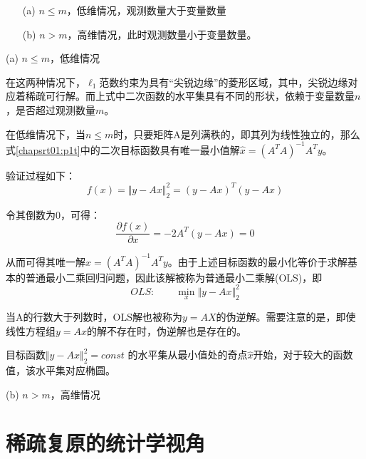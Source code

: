 \begin{enumerate}
	\item  [(a)]  $ n\leq m $，低维情况，观测数量大于变量数量
	\item  [(b)]  $ n>m $，高维情况，此时观测数量小于变量数量。
\end{enumerate}

(a)  $ n\leq m $，低维情况


在这两种情况下，$ \ell_1 $范数约束为具有“尖锐边缘”的菱形区域，其中，尖锐边缘对应着稀疏可行解。而上式中二次函数的水平集具有不同的形状，依赖于变量数量$ n $，是否超过观测数量$ m $。

在低维情况下，当$ n\leq m $时，只要矩阵A是列满秩的，即其列为线性独立的，那么式\ref{chapsrt01:p1t}中的二次目标函数具有唯一最小值解$ \hat{x} =(A^TA)^{-1}A^T y $。

验证过程如下：
\begin{equation*}\label{key}
f(x)       =         \Vert y-Ax \Vert_2^2 = (y-Ax)^{T}(y-Ax)    
\end{equation*}

令其倒数为0，可得：
\begin{equation*}\label{key}
\dfrac{\partial f(x)}{\partial x}  = -2A^T(y-Ax) =0
\end{equation*}

从而可得其唯一解$ \hat{x} =(A^TA)^{-1}A^T y $。由于上述目标函数的最小化等价于求解基本的普通最小二乘回归问题，因此该解被称为普通最小二乘解(OLS)，即
$$   OLS:\qquad  \min_{x}  \Vert y-Ax \Vert^2_2$$

当A的行数大于列数时，OLS解也被称为$ y=AX $的伪逆解。需要注意的是，即使线性方程组$ y =Ax $的解不存在时，伪逆解也是存在的。

目标函数$ \Vert y-Ax \Vert^2_2 =const $ 的水平集从最小值处的奇点$ \hat{x} $开始，对于较大的函数值，该水平集对应椭圆。

(b) $ n>m $，高维情况



\section{稀疏复原的统计学视角}

